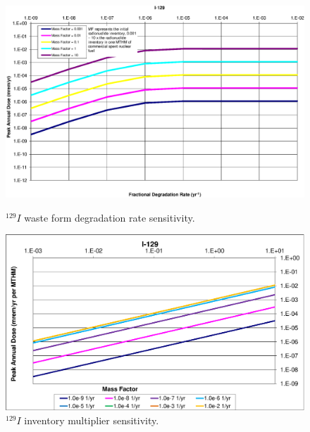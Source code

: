 \begin{figure}[ht!]
\begin{minipage}[b]{0.45\linewidth}
\centering
\includegraphics[width=\linewidth]{./chapters/nuclide_sensitivity/clay/WFDegAndInv/I-129.eps}
\caption{$^{129}I$ waste form degradation rate sensitivity.}
\label{fig:WFDegI129}

\end{minipage}
\hspace{0.05\linewidth}
\begin{minipage}[b]{0.45\linewidth}

\includegraphics[width=\linewidth]{./chapters/nuclide_sensitivity/clay/WFDegAndInv/I-129-MF.eps}
\caption{$^{129}I$ inventory multiplier sensitivity.}
\label{fig:WFDegI129MF}

\end{minipage}
\end{figure}
